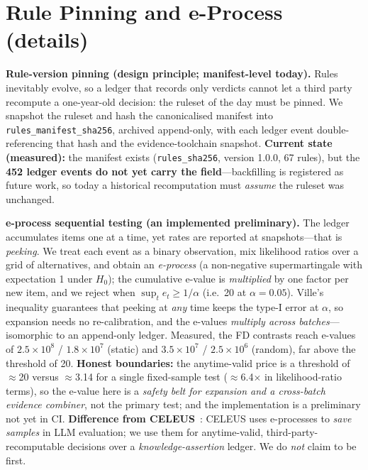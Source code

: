 \documentclass{article}
\begin{document}
\section{Rule Pinning and e-Process (details)}
\label{app:pinning}
\textbf{Rule-version pinning (design principle; manifest-level today).} Rules inevitably evolve, so
a ledger that records only verdicts cannot let a third party recompute a one-year-old decision: the
ruleset of the day must be pinned. We snapshot the ruleset and hash the canonicalised manifest into
\texttt{rules\_manifest\_sha256}, archived append-only, with each ledger event double-referencing
that hash and the evidence-toolchain snapshot. \textbf{Current state (measured):} the manifest
exists (\texttt{rules\_sha256}, version 1.0.0, 67 rules), but the \textbf{452 ledger events do not
yet carry the field}---backfilling is registered as future work, so today a historical recomputation
must \emph{assume} the ruleset was unchanged.

\textbf{e-process sequential testing (an implemented preliminary).} The ledger accumulates items one
at a time, yet rates are reported at snapshots---that is \emph{peeking}. We treat each event as a
binary observation, mix likelihood ratios over a grid of alternatives, and obtain an \emph{e-process}
(a non-negative supermartingale with expectation 1 under $H_0$); the cumulative e-value is
\emph{multiplied} by one factor per new item, and we reject when $\sup_t e_t \ge 1/\alpha$ (i.e.\ 20
at $\alpha{=}0.05$). Ville's inequality guarantees that peeking at \emph{any} time keeps the
type-I error at $\alpha$, so expansion needs no re-calibration, and the e-values \emph{multiply
across batches}---isomorphic to an append-only ledger. Measured, the FD contrasts reach e-values of
$2.5\times10^8$ / $1.8\times10^7$ (static) and $3.5\times10^7$ / $2.5\times10^6$ (random), far
above the threshold of 20. \textbf{Honest boundaries:} the anytime-valid price is a threshold of
$\approx$20 versus $\approx$3.14 for a single fixed-sample test ($\approx$6.4$\times$ in
likelihood-ratio terms), so the e-value here is a \emph{safety belt for expansion and a cross-batch
evidence combiner}, not the primary test; and the implementation is a preliminary not yet in CI.
\textbf{Difference from CELEUS}~\cite{zhou2026celeus}: CELEUS uses e-processes to \emph{save
samples} in LLM evaluation; we use them for anytime-valid, third-party-recomputable decisions over a
\emph{knowledge-assertion} ledger. We do \emph{not} claim to be first.
\end{document}
